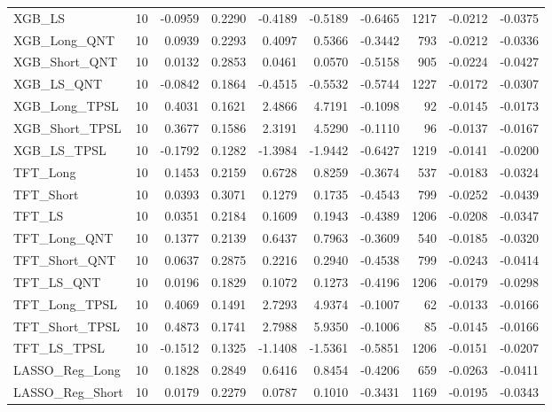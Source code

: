 \begin{tabular}{llrrrrrrrr}
\cline{1-10}
XGB\_LS & 10 & -0.0959 & 0.2290 & -0.4189 & -0.5189 & -0.6465 & 1217 & -0.0212 & -0.0375 \\
\cline{1-10}
XGB\_Long\_QNT & 10 & 0.0939 & 0.2293 & 0.4097 & 0.5366 & -0.3442 & 793 & -0.0212 & -0.0336 \\
\cline{1-10}
XGB\_Short\_QNT & 10 & 0.0132 & 0.2853 & 0.0461 & 0.0570 & -0.5158 & 905 & -0.0224 & -0.0427 \\
\cline{1-10}
XGB\_LS\_QNT & 10 & -0.0842 & 0.1864 & -0.4515 & -0.5532 & -0.5744 & 1227 & -0.0172 & -0.0307 \\
\cline{1-10}
XGB\_Long\_TPSL & 10 & 0.4031 & 0.1621 & 2.4866 & 4.7191 & -0.1098 & 92 & -0.0145 & -0.0173 \\
\cline{1-10}
XGB\_Short\_TPSL & 10 & 0.3677 & 0.1586 & 2.3191 & 4.5290 & -0.1110 & 96 & -0.0137 & -0.0167 \\
\cline{1-10}
XGB\_LS\_TPSL & 10 & -0.1792 & 0.1282 & -1.3984 & -1.9442 & -0.6427 & 1219 & -0.0141 & -0.0200 \\
\cline{1-10}
TFT\_Long & 10 & 0.1453 & 0.2159 & 0.6728 & 0.8259 & -0.3674 & 537 & -0.0183 & -0.0324 \\
\cline{1-10}
TFT\_Short & 10 & 0.0393 & 0.3071 & 0.1279 & 0.1735 & -0.4543 & 799 & -0.0252 & -0.0439 \\
\cline{1-10}
TFT\_LS & 10 & 0.0351 & 0.2184 & 0.1609 & 0.1943 & -0.4389 & 1206 & -0.0208 & -0.0347 \\
\cline{1-10}
TFT\_Long\_QNT & 10 & 0.1377 & 0.2139 & 0.6437 & 0.7963 & -0.3609 & 540 & -0.0185 & -0.0320 \\
\cline{1-10}
TFT\_Short\_QNT & 10 & 0.0637 & 0.2875 & 0.2216 & 0.2940 & -0.4538 & 799 & -0.0243 & -0.0414 \\
\cline{1-10}
TFT\_LS\_QNT & 10 & 0.0196 & 0.1829 & 0.1072 & 0.1273 & -0.4196 & 1206 & -0.0179 & -0.0298 \\
\cline{1-10}
TFT\_Long\_TPSL & 10 & 0.4069 & 0.1491 & 2.7293 & 4.9374 & -0.1007 & 62 & -0.0133 & -0.0166 \\
\cline{1-10}
TFT\_Short\_TPSL & 10 & 0.4873 & 0.1741 & 2.7988 & 5.9350 & -0.1006 & 85 & -0.0145 & -0.0166 \\
\cline{1-10}
TFT\_LS\_TPSL & 10 & -0.1512 & 0.1325 & -1.1408 & -1.5361 & -0.5851 & 1206 & -0.0151 & -0.0207 \\
\cline{1-10}
LASSO\_Reg\_Long & 10 & 0.1828 & 0.2849 & 0.6416 & 0.8454 & -0.4206 & 659 & -0.0263 & -0.0411 \\
\cline{1-10}
LASSO\_Reg\_Short & 10 & 0.0179 & 0.2279 & 0.0787 & 0.1010 & -0.3431 & 1169 & -0.0195 & -0.0343 \\

\end{tabular}
